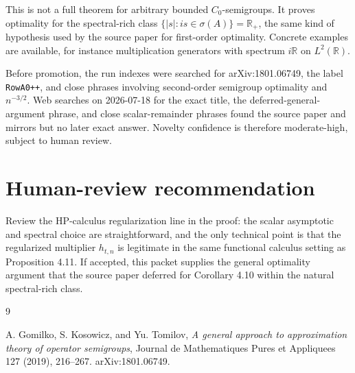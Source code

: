 \documentclass[11pt]{article}
\newcommand{\R}{\mathbb R}
\begin{document}
This is not a full theorem for arbitrary bounded \(C_0\)-semigroups.  It proves
optimality for the spectral-rich class
\(\{|s|:is\in\sigma(A)\}=\R_+\), the same kind of hypothesis used by the source
paper for first-order optimality.  Concrete examples are available, for
instance multiplication generators with spectrum \(i\R\) on \(L^2(\R)\).

Before promotion, the run indexes were searched for arXiv:1801.06749, the
label \texttt{RowA0++}, and close phrases involving second-order semigroup
optimality and \(n^{-3/2}\).  Web searches on 2026-07-18 for the exact title,
the deferred-general-argument phrase, and close scalar-remainder phrases found
the source paper and mirrors but no later exact answer.  Novelty confidence is
therefore moderate-high, subject to human review.

\section*{Human-review recommendation}

Review the HP-calculus regularization line in the proof: the scalar asymptotic
and spectral choice are straightforward, and the only technical point is that
the regularized multiplier \(h_{t,n}\) is legitimate in the same functional
calculus setting as Proposition 4.11.  If accepted, this packet supplies the
general optimality argument that the source paper deferred for Corollary 4.10
within the natural spectral-rich class.

\begin{thebibliography}{9}

A. Gomilko, S. Kosowicz, and Yu. Tomilov,
\emph{A general approach to approximation theory of operator semigroups},
Journal de Mathematiques Pures et Appliquees 127 (2019), 216--267.
arXiv:1801.06749.

\end{thebibliography}
\end{document}
